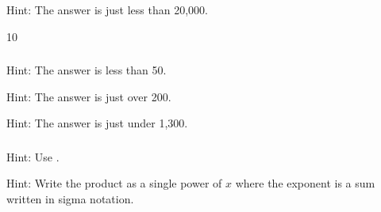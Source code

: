 \subsubsection*{ \answers}
\begin{apart}
    \item Hint: The answer is just less than 20,000.
    \item 10
\end{apart}

\subsubsection*{ \answers}
\begin{apart}
    \item Hint: The answer is less than 50.
    \item Hint: The answer is just over 200.
    \item Hint: The answer is just under 1,300.
\end{apart}

\subsubsection*{ \answers}
\begin{apart}
    \item Hint: Use .
    \item Hint: Write the product as a single power of $x$ where the exponent is a sum written in sigma notation.
\end{apart}















